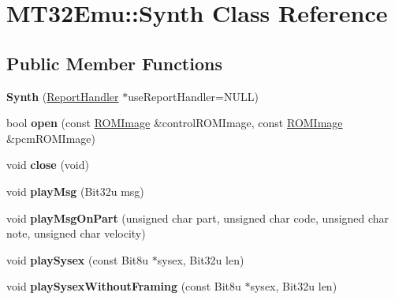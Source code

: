 \hypertarget{classMT32Emu_1_1Synth}{\section{M\-T32\-Emu\-:\-:Synth Class Reference}
\label{classMT32Emu_1_1Synth}
}
\subsection*{Public Member Functions}
\begin{DoxyCompactItemize}
\item 
\hypertarget{classMT32Emu_1_1Synth_a49b86faee20290f548817c01296a8da7}{{\bfseries Synth} (\hyperlink{classMT32Emu_1_1ReportHandler}{Report\-Handler} $\ast$use\-Report\-Handler=N\-U\-L\-L)}\label{classMT32Emu_1_1Synth_a49b86faee20290f548817c01296a8da7}

\item 
\hypertarget{classMT32Emu_1_1Synth_a876e3526f6066cc8c9ddc3869cc88441}{bool {\bfseries open} (const \hyperlink{classMT32Emu_1_1ROMImage}{R\-O\-M\-Image} \&control\-R\-O\-M\-Image, const \hyperlink{classMT32Emu_1_1ROMImage}{R\-O\-M\-Image} \&pcm\-R\-O\-M\-Image)}\label{classMT32Emu_1_1Synth_a876e3526f6066cc8c9ddc3869cc88441}

\item 
\hypertarget{classMT32Emu_1_1Synth_a4d92a84640ea1686bec23ecb040585b5}{void {\bfseries close} (void)}\label{classMT32Emu_1_1Synth_a4d92a84640ea1686bec23ecb040585b5}

\item 
\hypertarget{classMT32Emu_1_1Synth_ab7a7cbb0ea189316dc2a9a939e11c0e7}{void {\bfseries play\-Msg} (Bit32u msg)}\label{classMT32Emu_1_1Synth_ab7a7cbb0ea189316dc2a9a939e11c0e7}

\item 
\hypertarget{classMT32Emu_1_1Synth_a18fc2d79d2fd20b5546dff38be2c22a9}{void {\bfseries play\-Msg\-On\-Part} (unsigned char part, unsigned char code, unsigned char note, unsigned char velocity)}\label{classMT32Emu_1_1Synth_a18fc2d79d2fd20b5546dff38be2c22a9}

\item 
\hypertarget{classMT32Emu_1_1Synth_ae222a78e7569ffa14518dd3a8c908fb2}{void {\bfseries play\-Sysex} (const Bit8u $\ast$sysex, Bit32u len)}\label{classMT32Emu_1_1Synth_ae222a78e7569ffa14518dd3a8c908fb2}

\item 
\hypertarget{classMT32Emu_1_1Synth_ae9b3ad93c45389d7baca9a3838575fd3}{void {\bfseries play\-Sysex\-Without\-Framing} (const Bit8u $\ast$sysex, Bit32u len)}\label{classMT32Emu_1_1Synth_ae9b3ad93c45389d7baca9a3838575fd3}


\end{DoxyCompactItemize}
